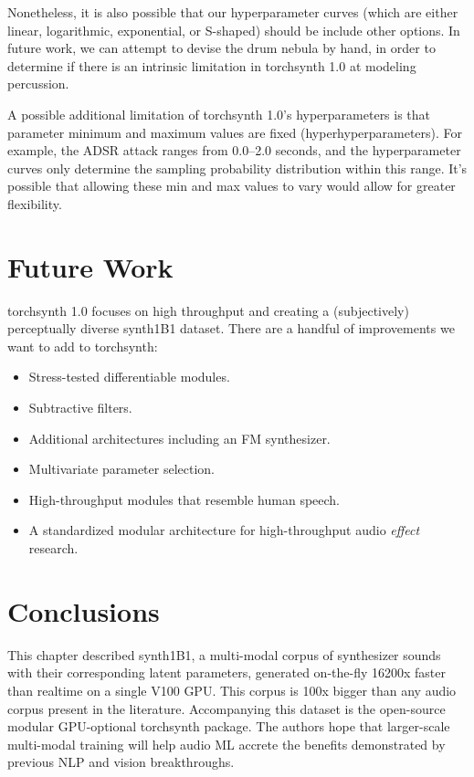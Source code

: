 Nonetheless, it is also possible that our hyperparameter curves (which are either linear, logarithmic, exponential, or S-shaped) should be include other options. In future work, we can attempt to devise the drum nebula by hand, in order to determine if there is an intrinsic limitation in torchsynth 1.0 at modeling percussion.

A possible additional limitation of torchsynth 1.0's hyperparameters is that parameter minimum and maximum values are fixed (hyperhyperparameters). For example, the ADSR attack ranges from 0.0--2.0 seconds, and the hyperparameter curves only determine the sampling probability distribution within this range. It's possible that allowing these min and max values to vary would allow for greater flexibility.
\fi

\section{Future Work}

torchsynth 1.0 focuses on high throughput and creating a (subjectively) perceptually diverse synth1B1 dataset. %
There are a handful of improvements we want to add to torchsynth:
\begin{itemize}
\item Stress-tested differentiable modules.
\item Subtractive filters.
\item Additional architectures including an FM synthesizer.
\item Multivariate parameter selection.
\item High-throughput modules that resemble human speech.
\item A standardized modular architecture for high-throughput audio {\em effect} research.
\end{itemize}


\section{Conclusions}

This chapter described synth1B1, a multi-modal corpus of synthesizer sounds with their corresponding latent parameters, generated on-the-fly 16200x faster than realtime on a single V100 GPU. This corpus is 100x bigger than any audio corpus present in the literature. Accompanying this dataset is the open-source modular GPU-optional torchsynth package. The authors hope that larger-scale multi-modal training will help audio ML accrete the benefits demonstrated by previous NLP and vision breakthroughs.

